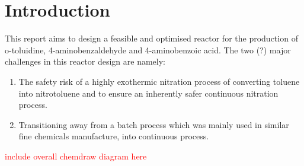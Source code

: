 \section{Introduction}
This report aims to design a feasible and optimised reactor for the production of o-toluidine, 4-aminobenzaldehyde and 4-aminobenzoic acid. The two (?) major challenges in this reactor design are namely:
\begin{enumerate}
    \item The safety risk of a highly exothermic nitration process of converting toluene into nitrotoluene and to ensure an inherently safer continuous nitration process. 
    \item Transitioning away from a batch process which was mainly used in similar fine chemicals manufacture, into continuous process. 
\end{enumerate}




\textcolor{red}{include overall chemdraw diagram here} %
